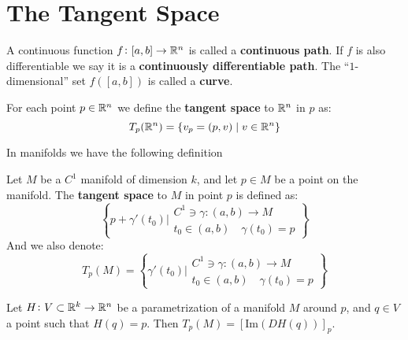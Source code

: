 \documentclass[11pt,a4paper]{article}
\begin{document}
\section{The Tangent Space}
\begin{definition}
  A continuous function $f \colon [a,b] \to \mathbb{R}^n$ is called a
  \textbf{continuous path}. If $f$ is also differentiable we say
  it is a \textbf{continuously differentiable path}. The ``$1$-
  dimensional'' set $f([a,b])$ is called a \textbf{curve}.
\end{definition}
\begin{definition}
  For each point $p \in \mathbb{R}^n$ we define the \textbf{tangent space}
  to $\mathbb{R}^n$ in $p$ as:
  \[
    T_p(\mathbb{R}^n) = \{v_p = (p,v) \mid v \in \mathbb{R}^n\}
  \]
\end{definition}
In manifolds we have the following definition
\begin{definition}
  Let $M$ be a $C^1$ manifold of dimension $k$, and let $p \in M$ 
  be a point on the manifold. The \textbf{tangent space} to $M$ in 
  point $p$ is defined as:
  \[
    \left\{
      p + \gamma'(t_0) \biggr\vert 
      \substack{
      C^1 \ni \gamma \colon (a,b) \to M \\
      t_0 \in (a,b) \quad \gamma(t_0) = p}
    \right\}
  \]
  And we also denote:
  \[
    T_p(M) = \left\{
      \gamma'(t_0) \biggr\vert 
      \substack{
      C^1 \ni \gamma \colon (a,b) \to M \\
      t_0 \in (a,b) \quad \gamma(t_0) = p}
    \right\}
  \]
\end{definition}
\begin{remark}
  Let $H \colon V \subset \mathbb{R}^k \to \mathbb{R}^n$ be a parametrization
  of a manifold $M$ around $p$, and $q \in V$ a point such that
  $H(q) = p$. Then $T_p(M) = [\mathrm{Im}(DH(q))]_p$.
\end{remark}
\end{document}
